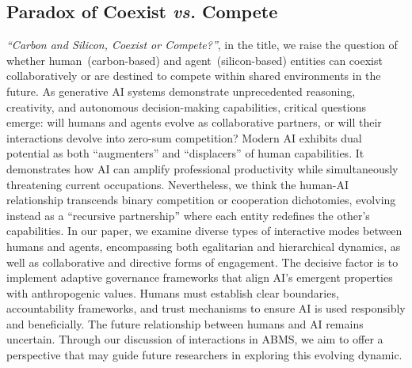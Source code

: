 \subsection{Paradox of Coexist \textit{vs.} Compete}
\textit{``Carbon and Silicon, Coexist or Compete?''}, in the title, we raise the question of whether human~(carbon-based) and agent~(silicon-based) entities can coexist collaboratively or are destined to compete within shared environments in the future.
As generative AI systems demonstrate unprecedented reasoning, creativity, and autonomous decision-making capabilities, critical questions emerge: will humans and agents evolve as collaborative partners, or will their interactions devolve into zero-sum competition?
Modern AI exhibits dual potential as both ``augmenters'' and ``displacers'' of human capabilities.
It demonstrates how AI can amplify professional productivity while simultaneously threatening current occupations. 
Nevertheless, we think the human-AI relationship transcends binary competition or cooperation dichotomies, evolving instead as a ``recursive partnership'' where each entity redefines the other's capabilities.
In our paper, we examine diverse types of interactive modes between humans and agents, encompassing both egalitarian and hierarchical dynamics, as well as collaborative and directive forms of engagement.
The decisive factor is to implement adaptive governance frameworks that align AI's emergent properties with anthropogenic values.
Humans must establish clear boundaries, accountability frameworks, and trust mechanisms to ensure AI is used responsibly and beneficially.
The future relationship between humans and AI remains uncertain. 
Through our discussion of interactions in  ABMS, we aim to offer a perspective that may guide future researchers in exploring this evolving dynamic.

